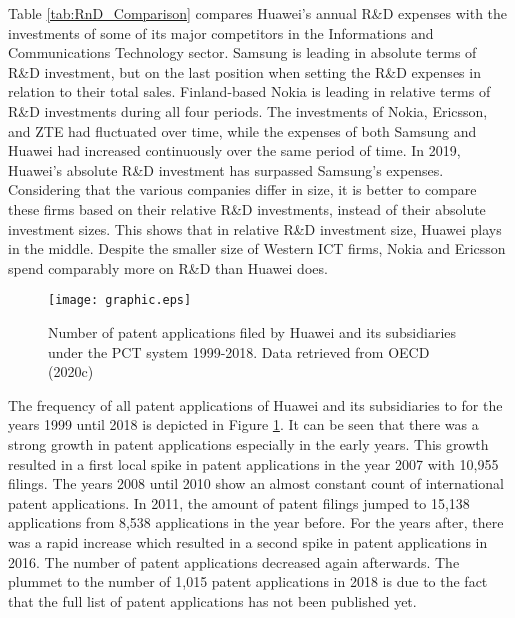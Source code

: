 \documentclass[11pt,a4paper,oneside]{report}
\begin{document}
Table \ref{tab:RnD_Comparison} compares Huawei's annual R\&D expenses with the investments of some of its major competitors in the Informations and Communications Technology sector. Samsung is leading in absolute terms of R\&D investment, but on the last position when setting the R\&D expenses in relation to their total sales. Finland-based Nokia is leading in relative terms of R\&D investments during all four periods. The investments of Nokia, Ericsson, and ZTE had fluctuated over time, while the expenses of both Samsung and Huawei had increased continuously over the same period of time. In 2019, Huawei's absolute R\&D investment has surpassed Samsung's expenses. Considering that the various companies differ in size, it is better to compare these firms based on their relative R\&D investments, instead of their absolute investment sizes. This shows that in relative R\&D investment size, Huawei plays in the middle. Despite the smaller size of Western ICT firms, Nokia and Ericsson spend comparably more on R\&D than Huawei does.\\

\begin{figure}[htb]
	\centering
	\texttt{[image: graphic.eps]}
	\caption{Number of patent applications filed by Huawei and its subsidiaries under the PCT system 1999-2018. Data retrieved from OECD (2020c)}
	\label{fig:huawei_priority_year}
\end{figure}

The frequency of all patent applications of Huawei and its subsidiaries to  for the years 1999 until 2018 is depicted in Figure \ref{fig:huawei_priority_year}. It can be seen that there was a strong growth in patent applications especially in the early years. This growth resulted in a first local spike in patent applications in the year 2007 with 10,955 filings. The years 2008 until 2010 show an almost constant count of international patent applications. In 2011, the amount of patent filings jumped to 15,138 applications from 8,538 applications in the year before. For the years after, there was a rapid increase which resulted in a second spike in patent applications in 2016.  The number of patent applications decreased again afterwards. The plummet to the number of 1,015 patent applications in 2018 is due to the fact that the full list of patent applications has not been published yet.\\
\end{document}
